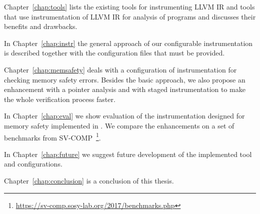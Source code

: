 Chapter~\ref{chap:tools} lists the existing tools for instrumenting LLVM IR and
tools that use instrumentation of LLVM IR for analysis of programs and
discusses their benefits and drawbacks.

In Chapter~\ref{chap:instr} the general approach of our configurable
instrumentation is described together with the configuration files that must
be provided.

Chapter~\ref{chap:memsafety} deals with a configuration of instrumentation for
checking memory safety errors. Besides the basic approach, we also propose an
enhancement with a pointer analysis and with staged instrumentation to make the
whole verification process faster.

In Chapter~\ref{chap:eval} we show evaluation of the instrumentation designed
for memory safety implemented in \symbiotic. We compare the enhancements on a
set of benchmarks from
SV-COMP~\footnote{\url{https://sv-comp.sosy-lab.org/2017/benchmarks.php}}.

In Chapter~\ref{chap:future} we suggest future development of the
implemented tool and configurations.

Chapter~\ref{chap:conclusion} is a conclusion of this thesis.
